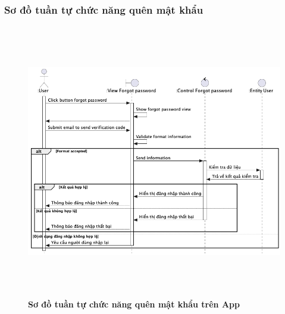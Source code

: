 \documentclass{article}%
\begin{document}
\subsubsection{Sơ đồ tuần tự chức năng quên mật khẩu}
    \begin{figure}[H]
         \centering
         \includegraphics[width=16cm,height=12cm]{Images/mobile_app/forgot_password.png}
         \caption[Sơ đồ tuần tự chức năng quên mật khẩu trên App]{\bfseries \fontsize{12pt}{0pt}
         \selectfont Sơ đồ tuần tự chức năng quên mật khẩu trên App}
         \label{hinh21} %
    \end{figure}
\end{document}
